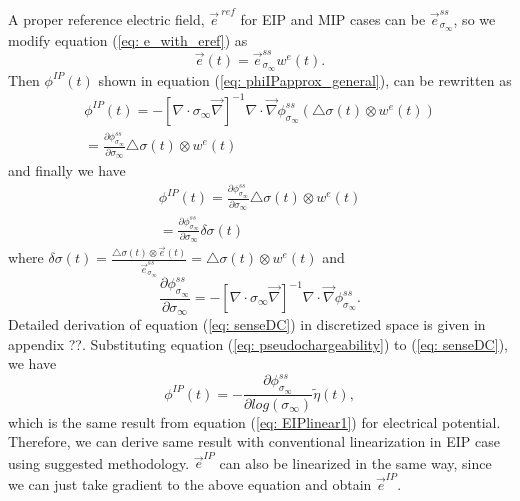 \documentclass[a4paper, 11pt]{article}
\renewcommand{\div}{\nabla\cdot}
\newcommand{\grad}{\vec \nabla}
\newcommand{\siginf}{\sigma_\infty}
\newcommand{\dsig}{\triangle\sigma}
\newcommand {\e}  { {\vec e} }
\newcommand{\peta}{\tilde{\eta}}
\newcommand{\sigpert}{\delta\sigma}
\begin{document}
A proper reference electric field, $\e^{\ ref}$ for EIP and MIP cases can be $\e^{ss}_{\siginf}$, so we modify equation (\ref{eq: e_with_eref}) as
\begin{equation*}
    \e(t) = \e^{ss}_{\siginf}w^e(t).
\end{equation*}
Then $\phi^{IP}(t)$ shown in equation (\ref{eq: phiIPapprox_general}), can be rewritten as
\begin{eqnarray*}
  \phi^{IP}(t) = -[\div\siginf\grad]^{-1}\div\grad\phi^{ss}_{\siginf}(\dsig(t)\otimes w^e(t)) \\
               =\frac{\partial \phi^{ss}_{\siginf}}{\partial \siginf}\dsig(t)\otimes w^e(t)
\end{eqnarray*}
and finally we have
\begin{eqnarray}
    \phi^{IP}(t) = \frac{\partial \phi^{ss}_{\siginf}}{\partial \siginf}\dsig(t)\otimes w^e(t) \nonumber\\
                 =\frac{\partial \phi^{ss}_{\siginf}}{\partial \siginf}\sigpert(t)
\end{eqnarray}
where $\sigpert(t) = \frac{\dsig(t)\otimes \e(t)}{\e^{ss}_{\siginf}}=\dsig(t)\otimes w^e(t)$ and
\begin{equation}
    \frac{\partial \phi^{ss}_{\siginf}}{\partial \siginf} = -[\div\siginf\grad]^{-1}\div\grad\phi^{ss}_{\siginf}.
    \label{eq: senseDC}
\end{equation}
Detailed derivation of equation (\ref{eq: senseDC}) in discretized space is given in appendix ??. Substituting equation (\ref{eq: pseudochargeability}) to (\ref{eq: senseDC}), we have
\begin{equation}
    \phi^{IP}(t) = -\frac{\partial \phi^{ss}_{\siginf}}{\partial log(\siginf)}\peta(t),
    \label{eq: phiIPapprox}
\end{equation}
which is the same result from equation (\ref{eq: EIPlinear1}) for electrical potential. Therefore, we can derive same result with conventional linearization in EIP case using suggested methodology. $\e^{IP}$ can also be linearized in the same way, since we can just take gradient to the above equation and obtain $\e^{IP}$.
\end{document}

